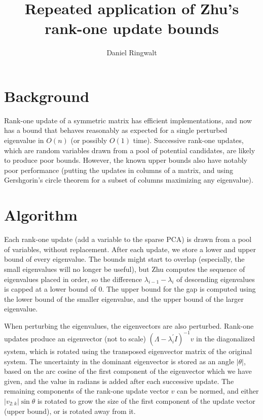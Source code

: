\documentclass{article}
\title{Repeated application of Zhu's rank-one update bounds}
\author{Daniel Ringwalt}
\begin{document}
	
\maketitle

\section{Background}

Rank-one update of a symmetric matrix has efficient implementations, and now has a bound that behaves reasonably as expected for a single perturbed eigenvalue in $O(n)$ (or possibly $O(1)$ time). Successive rank-one updates, which are random variables drawn from a pool of potential candidates, are likely to produce poor bounds. However, the known upper bounds also have notably poor performance (putting the updates in columns of a matrix, and using Gershgorin's circle theorem for a subset of columns maximizing any eigenvalue).

\section{Algorithm}

Each rank-one update (add a variable to the sparse PCA) is drawn from a pool of variables, without replacement. After each update, we store a lower and upper bound of every eigenvalue. The bounds might start to overlap (especially, the small eigenvalues will no longer be useful), but Zhu computes the sequence of eigenvalues placed in order, so the difference $\lambda_{i-1} - \lambda_i$ of descending eigenvalues is capped at a lower bound of $0$. The upper bound for the gap is computed using the lower bound of the smaller eigenvalue, and the upper bound of the larger eigenvalue.

When perturbing the eigenvalues, the eigenvectors are also perturbed. Rank-one updates produce an eigenvector (not to scale) $(\Lambda - \lambda_i^\prime I)^{-1} v$ in the diagonalized system, which is rotated using the transposed eigenvector matrix of the original system. The uncertainty in the dominant eigenvector is stored as an angle $|\theta|$, based on the arc cosine of the first component of the eigenvector which we have given, and the value in radians is added after each successive update. The remaining components of the rank-one update vector $v$ can be normed, and either $|v_{2:k}| \sin\theta$ is rotated to grow the size of the first component of the update vector (upper bound), or is rotated away from it.
\end{document}
